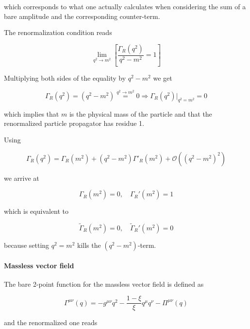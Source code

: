 \documentclass[../FeynCalcManual.tex]{subfiles}
\begin{document}
which corresponds to what one actually calculates when considering the
sum of a bare amplitude and the corresponding counter-term.

The renormalization condition reads

\begin{equation}
\lim_{q^2 \to m^2} \left [ \frac{\Gamma_R (q^2)}{q^2 - m^2}  = 1 \right ]
\end{equation}

Multiplying both sides of the equality by \(q^2-m^2\) we get

\begin{equation}
\Gamma_R (q^2)  = ( q^2-m^2) \overset{q^2 \to m^2}{=} 0 \Rightarrow \Gamma_R (q^2) \biggl |_{q^2=m^2}  = 0
\end{equation}

which implies that \(m\) is the physical mass of the particle and that
the renormalized particle propagator has residue 1.

Using

\begin{equation}
\Gamma_R (q^2) =  \Gamma_R (m^2) + (q^2 - m^2) \Gamma'_R (m^2) + \mathcal{O}( (q^2 - m^2)^2)
\end{equation}

we arrive at

\begin{equation}
\Gamma_R(m^2) = 0, \quad \Gamma_R'(m^2) = 1
\end{equation}

which is equivalent to

\begin{equation}
\tilde{\Gamma}_R(m^2) = 0, \quad \tilde{\Gamma}_R'(m^2) = 0
\end{equation}

because setting \(q^2 = m^2\) kills the \((q^2-m^2)\)-term.

\paragraph{Massless vector field}\label{massless-vector-field}

The bare 2-point function for the massless vector field is defined as

\begin{equation}
    \Gamma^{\mu \nu} (q) = -g^{\mu \nu} q^2 - \frac{1-\xi}{\xi} q^{\mu} q^{\nu}  - \Pi^{\mu \nu} (q)
\end{equation}

and the renormalized one reads
\end{document}
